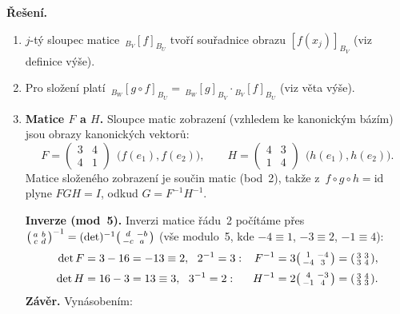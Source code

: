 \documentclass[11pt,a4paper]{article}
\begin{document}
\begin{priklad}
\textbf{Řešení.}
\begin{enumerate}[label=(\arabic*)]
  \item $j$-tý sloupec matice $\,{}_{B_V}[f]_{B_U}$ tvoří souřadnice obrazu $[f(x_j)]_{B_V}$ (viz definice výše).
  \item Pro složení platí $\,{}_{B_W}[g\circ f]_{B_U}=\,{}_{B_W}[g]_{B_V}\cdot{}_{B_V}[f]_{B_U}$ (viz věta výše).
  \item \textbf{Matice $F$ a $H$.} Sloupce matic zobrazení (vzhledem ke kanonickým bázím) jsou obrazy kanonických vektorů:
    \[ F=\begin{pmatrix}3&4\\4&1\end{pmatrix}\ \ \bigl(f(e_1),f(e_2)\bigr),\qquad H=\begin{pmatrix}4&3\\1&4\end{pmatrix}\ \ \bigl(h(e_1),h(e_2)\bigr). \]
    Matice složeného zobrazení je součin matic (bod~2), takže z~$f\circ g\circ h=\mathrm{id}$ plyne $FGH=I$, odkud $G=F^{-1}H^{-1}$.\par
    \textbf{Inverze (mod~5).} Inverzi matice řádu~2 počítáme přes $\begin{psmallmatrix}a&b\\c&d\end{psmallmatrix}^{-1}=(\det)^{-1}\begin{psmallmatrix}d&-b\\-c&a\end{psmallmatrix}$ (vše modulo~5, kde $-4\equiv1$, $-3\equiv2$, $-1\equiv4$):
    \[
    \begin{aligned}
      \det F&=3-16=-13\equiv2,\ \ 2^{-1}=3: & F^{-1}&=3\begin{psmallmatrix}1&-4\\-4&3\end{psmallmatrix}=\begin{psmallmatrix}3&3\\3&4\end{psmallmatrix},\\[2pt]
      \det H&=16-3=13\equiv3,\ \ 3^{-1}=2: & H^{-1}&=2\begin{psmallmatrix}4&-3\\-1&4\end{psmallmatrix}=\begin{psmallmatrix}3&4\\3&3\end{psmallmatrix}.
    \end{aligned}
    \]
    \textbf{Závěr.} Vynásobením:

\end{enumerate}
\end{priklad}
\end{document}
